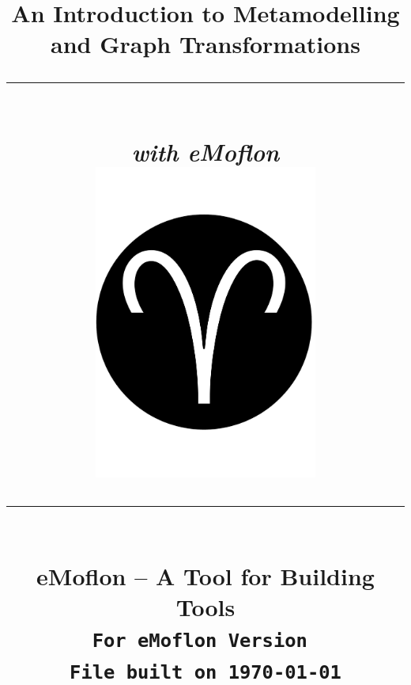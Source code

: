 \title{
\flushright
{\LARGE\bfseries An Introduction to Metamodelling\\
and Graph Transformations}
\noindent\rule[-1ex]{\textwidth}{5pt}\\[2.5ex]
\hfill\emph{\LARGE\bfseries with eMoflon}\\
\center
\includegraphics[width=0.55\textwidth]{../../org.moflon.doc.handbook.00_common/images/eMoflon3}
\flushleft
\noindent\rule[-1ex]{0.5\textwidth}{1.5pt}\\[1.5 ex]
\Large\bfseries eMoflon -- A Tool for Building Tools\\
{\small \texttt{For eMoflon Version \versionNumber}}\\
{\small \texttt{File built on \today}}\\    
} %

\date{}  
\author{} 